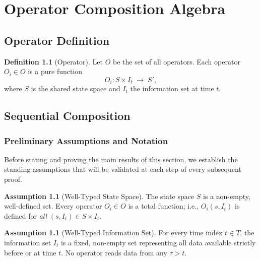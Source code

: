 \documentclass[12pt,openany]{book}
\newcommand{\calI}{\mathcal{I}}
\numberwithin{equation}{chapter}
\theoremstyle{plain}
\theoremstyle{definition}
\newtheorem{definition}[theorem]{Definition}
\newtheorem{assumption}[theorem]{Assumption}
\theoremstyle{remark}
\numberwithin{equation}{chapter}
\theoremstyle{plain}
\newcommand{\calO}{\mathcal{O}}
\newcommand{\calS}{\mathcal{S}}
\newcommand{\calT}{\mathcal{T}}
\def\calI{I}%
\def\calS{S}%
\def\calT{T}%
\def\calO{O}%
\begin{document}
\chapter{Operator Composition Algebra}
\label{ch:operators}

\section{Operator Definition}

\begin{definition}[Operator]
\label{def:operator}
Let $\calO$ be the set of all operators.  Each operator
$O_i \in \calO$ is a pure function
\begin{equation}
  O_i : \calS \times \calI_t \;\to\; \calS',
  \label{eq:operator-def}
\end{equation}
where $\calS$ is the shared state space and $\calI_t$ the information
set at time $t$.
\end{definition}

\section{Sequential Composition}

\subsection{Preliminary Assumptions and Notation}
\label{subsec:seq-prelim}

Before stating and proving the main results of this section, we
establish the standing assumptions that will be validated at each
step of every subsequent proof.

\begin{assumption}[Well-Typed State Space]
\label{asm:state-space}
The state space $\calS$ is a non-empty, well-defined set.  Every
operator $O_i \in \calO$ is a total function; i.e., $O_i(s, \calI_t)$
is defined for \emph{all} $(s, \calI_t) \in \calS \times \calI_t$.
\end{assumption}

\begin{assumption}[Well-Typed Information Set]
\label{asm:info-set}
For every time index $t \in \calT$, the information set $\calI_t$ is
a fixed, non-empty set representing all data available strictly before
or at time $t$.  No operator reads data from any $\tau > t$.
\end{assumption}
\end{document}
